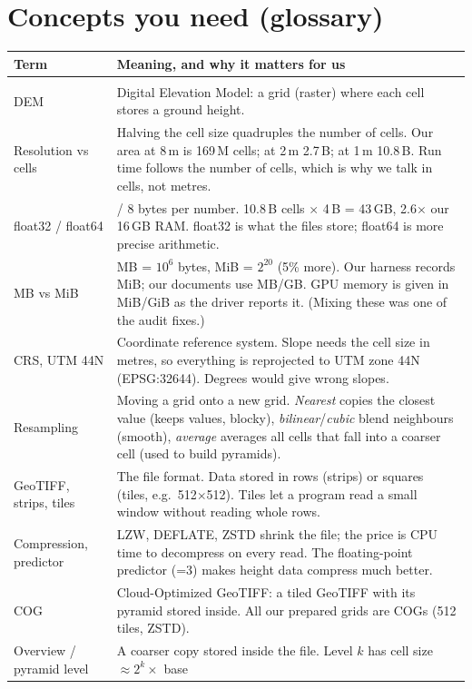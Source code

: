 ﻿\documentclass[11pt,a4paper]{article}
\begin{document}
\section{Concepts you need (glossary)}
\begin{longtable}{>{\raggedright\arraybackslash}p{3.4cm}>{\raggedright\arraybackslash}p{12.0cm}}
\toprule
Term & Meaning, and why it matters for us \\
\midrule
\endhead
\multicolumn{2}{l}{\textit{Data and formats}} \\
DEM & Digital Elevation Model: a grid (raster) where each cell stores a ground height. \\
Resolution vs cells & Halving the cell size quadruples the number of cells. Our area at 8\,m is 169\,M cells; at 2\,m
2.7\,B; at 1\,m 10.8\,B. Run time follows the number of cells, which is why we talk in cells, not metres. \\
float32 / float64 & 4 / 8 bytes per number. 10.8\,B cells $\times$ 4\,B = 43\,GB, 2.6$\times$ our 16\,GB RAM. float32 is
what the files store; float64 is more precise arithmetic. \\
MB vs MiB & MB = $10^6$ bytes, MiB = $2^{20}$ (5\% more). Our harness records MiB; our documents use MB/GB. GPU memory
is given in MiB/GiB as the driver reports it. (Mixing these was one of the audit fixes.) \\
CRS, UTM 44N & Coordinate reference system. Slope needs the cell size in metres, so everything is reprojected to UTM
zone 44N (EPSG:32644). Degrees would give wrong slopes. \\
Resampling & Moving a grid onto a new grid. \emph{Nearest} copies the closest value (keeps values, blocky),
\emph{bilinear}/\emph{cubic} blend neighbours (smooth), \emph{average} averages all cells that fall into a coarser cell
(used to build pyramids). \\
GeoTIFF, strips, tiles & The file format. Data stored in rows (strips) or squares (tiles, e.g.\ 512$\times$512). Tiles
let a program read a small window without reading whole rows. \\
Compression, predictor & LZW, DEFLATE, ZSTD shrink the file; the price is CPU time to decompress on every read. The
floating-point predictor (=3) makes height data compress much better. \\
COG & Cloud-Optimized GeoTIFF: a tiled GeoTIFF with its pyramid stored inside. All our prepared grids are COGs
(512 tiles, ZSTD). \\
Overview / pyramid level & A coarser copy stored inside the file. Level $k$ has cell size $\approx 2^k \times$ base

\end{longtable}
\end{document}
